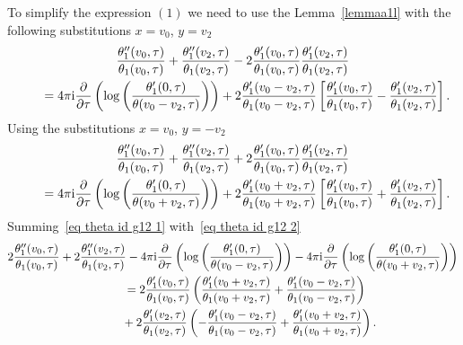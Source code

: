 \documentclass[10pt,a4paper]{amsart}
\numberwithin{equation}{section}
\begin{document}
To simplify the expression $(1)$ we need to use the Lemma~\ref{lemmaa1l} with the following substitutions $x=v_0$, $y=v_2$
\begin{gather}
\frac{\theta_1^{\prime\prime}(v_0,\tau)}{\theta_1(v_0,\tau)} +\frac{\theta_1^{\prime\prime}(v_2,\tau)}{\theta_1(v_2,\tau)} -2\frac{\theta_1^{\prime}(v_0,\tau)}{\theta_1(v_0,\tau)} \frac{\theta_1^{\prime}(v_2,\tau)}{\theta_1(v_2,\tau)}\nonumber
\\ \qquad
{}=4\pi {\rm i} \frac{\partial}{\partial \tau}\left(\log\left(\frac{\theta_1^{\prime}(0,\tau)}{\theta(v_0-v_2,\tau)}\right)\right)
+2\frac{\theta_1^{\prime}(v_0-v_2,\tau)}{\theta_1(v_0-v_2,\tau)} \left[\frac{\theta_1^{\prime}(v_0,\tau)}{\theta_1(v_0,\tau)} -\frac{\theta_1^{\prime}(v_2,\tau)}{\theta_1(v_2,\tau)}\right].
\label{eq theta id g12 1}
\end{gather}
Using the substitutions $x=v_0$, $y=-v_2$
\begin{gather}
\frac{\theta_1^{\prime\prime}(v_0,\tau)}{\theta_1(v_0,\tau)} +\frac{\theta_1^{\prime\prime}(v_2,\tau)}{\theta_1(v_2,\tau)} +2\frac{\theta_1^{\prime}(v_0,\tau)}{\theta_1(v_0,\tau)} \frac{\theta_1^{\prime}(v_2,\tau)}{\theta_1(v_2,\tau)}\nonumber
\\ \qquad
{}=4\pi {\rm i} \frac{\partial}{\partial \tau}\left(\log\left(\frac{\theta_1^{\prime}(0,\tau)}{\theta(v_0+v_2,\tau)}\right)\right) +2\frac{\theta_1^{\prime}(v_0+v_2,\tau)}{\theta_1(v_0+v_2,\tau)} \left[\frac{\theta_1^{\prime}(v_0,\tau)}{\theta_1(v_0,\tau)} +\frac{\theta_1^{\prime}(v_2,\tau)}{\theta_1(v_2,\tau)}\right].
\label{eq theta id g12 2}
\end{gather}
Summing~\eqref{eq theta id g12 1} with~\eqref{eq theta id g12 2}
\begin{gather*}
2\frac{\theta_1^{\prime\prime}(v_0,\tau)}{\theta_1(v_0,\tau)} +2\frac{\theta_1^{\prime\prime}(v_2,\tau)}{\theta_1(v_2,\tau)} -4\pi {\rm i} \frac{\partial}{\partial \tau}\left( \log\left(\frac{\theta_1^{\prime}(0,\tau)}{\theta(v_0-v_2,\tau)}\right)\right)
-4\pi {\rm i} \frac{\partial}{\partial \tau}\left( \log\left(\frac{\theta_1^{\prime}(0,\tau)}{\theta(v_0+v_2,\tau)}\right)\right)
\\ \qquad
{}=2\frac{\theta_1^{\prime}(v_0,\tau)}{\theta_1(v_0,\tau)} \left(\frac{\theta_1^{\prime}(v_0+v_2,\tau)}{\theta_1(v_0+v_2,\tau)} +\frac{\theta_1^{\prime}(v_0-v_2,\tau)}{\theta_1(v_0-v_2,\tau)}\right)
\\ \qquad \phantom{=}
+2\frac{\theta_1^{\prime}(v_2,\tau)}{\theta_1(v_2,\tau)} \left(-\frac{\theta_1^{\prime}(v_0-v_2,\tau)}{\theta_1(v_0-v_2,\tau)} +\frac{\theta_1^{\prime}(v_0+v_2,\tau)}{\theta_1(v_0+v_2,\tau)}\right).
\end{gather*}
\end{document}
